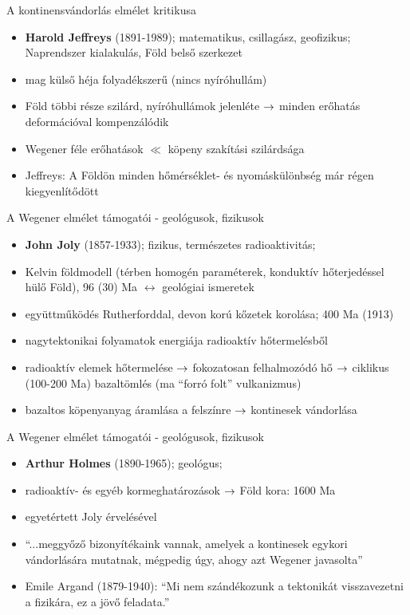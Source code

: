 \documentclass{beamer}
\begin{document}
\begin{frame}{A kontinensvándorlás elmélet kritikusa}
    \begin{itemize}
        \item \textbf{Harold Jeffreys} (1891-1989); matematikus, csillagász, geofizikus; Naprendszer kialakulás, Föld belső szerkezet
        \item mag külső héja folyadékszerű (nincs nyíróhullám)
        \item Föld többi része szilárd, nyíróhullámok jelenléte $\rightarrow$ minden erőhatás deformációval kompenzálódik
        \item Wegener féle erőhatások $\ll$ köpeny szakítási szilárdsága
        \item Jeffreys: A Földön minden hőmérséklet- és nyomáskülönbség már régen kiegyenlítődött
    \end{itemize}
\end{frame}


\begin{frame}{A Wegener elmélet támogatói - geológusok, fizikusok}
    \begin{itemize}
        \item \textbf{John Joly} (1857-1933); fizikus, természetes radioaktivitás;
        \item Kelvin földmodell (térben homogén paraméterek, konduktív hőterjedéssel hülő Föld), 96 (30) Ma $\leftrightarrow$ geológiai ismeretek
        \item együttműködés Rutherforddal, devon korú kőzetek korolása; 400 Ma (1913)
        \item nagytektonikai folyamatok energiája radioaktív hőtermelésből
        \item radioaktív elemek hőtermelése $\rightarrow$ fokozatosan felhalmozódó hő $\rightarrow$ ciklikus (100-200 Ma) bazaltömlés (ma ``forró folt'' vulkanizmus)
        \item bazaltos köpenyanyag áramlása a felszínre $\rightarrow$ kontinesek vándorlása
    \end{itemize}
\end{frame}


\begin{frame}{A Wegener elmélet támogatói - geológusok, fizikusok}
    \begin{itemize}
        \item \textbf{Arthur Holmes} (1890-1965); geológus;
        \item radioaktív- és egyéb kormeghatározások $\rightarrow$ Föld kora: 1600 Ma
        \item egyetértett Joly érvelésével
        \item ``...meggyőző bizonyítékaink vannak, amelyek a kontinesek egykori vándorlására mutatnak, mégpedig úgy, ahogy azt Wegener javasolta''
        \item Emile Argand (1879-1940): ``Mi nem szándékozunk a tektonikát visszavezetni a fizikára, ez a jövő feladata.''
    \end{itemize}
\end{frame}
\end{document}
